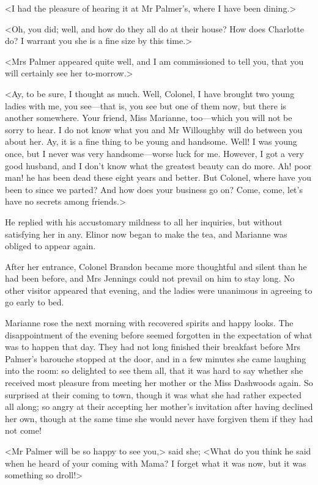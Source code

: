 <I had the pleasure of hearing it at Mr Palmer's, where I have been dining.>

<Oh, you did; well, and how do they all do at their house? How does Charlotte do? I warrant you she is a fine size by this time.>

<Mrs Palmer appeared quite well, and I am commissioned to tell you, that you will certainly see her to-morrow.>

<Ay, to be sure, I thought as much. Well, Colonel, I have brought two young ladies with me, you see—that is, you see but one of them now, but there is another somewhere. Your friend, Miss Marianne, too—which you will not be sorry to hear. I do not know what you and Mr Willoughby will do between you about her. Ay, it is a fine thing to be young and handsome. Well! I was young once, but I never was very handsome—worse luck for me. However, I got a very good husband, and I don't know what the greatest beauty can do more. Ah! poor man! he has been dead these eight years and better. But Colonel, where have you been to since we parted? And how does your business go on? Come, come, let's have no secrets among friends.>

He replied with his accustomary mildness to all her inquiries, but without satisfying her in any. Elinor now began to make the tea, and Marianne was obliged to appear again.

After her entrance, Colonel Brandon became more thoughtful and silent than he had been before, and Mrs Jennings could not prevail on him to stay long. No other visitor appeared that evening, and the ladies were unanimous in agreeing to go early to bed.

Marianne rose the next morning with recovered spirits and happy looks. The disappointment of the evening before seemed forgotten in the expectation of what was to happen that day. They had not long finished their breakfast before Mrs Palmer's barouche stopped at the door, and in a few minutes she came laughing into the room: so delighted to see them all, that it was hard to say whether she received most pleasure from meeting her mother or the Miss Dashwoods again. So surprised at their coming to town, though it was what she had rather expected all along; so angry at their accepting her mother's invitation after having declined her own, though at the same time she would never have forgiven them if they had not come!

<Mr Palmer will be so happy to see you,> said she; <What do you think he said when he heard of your coming with Mama? I forget what it was now, but it was something so droll!>

